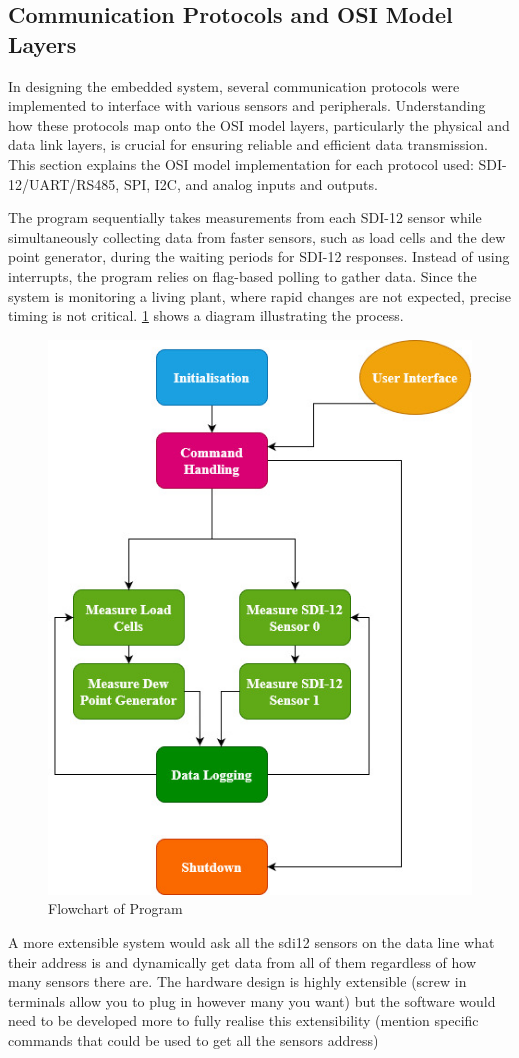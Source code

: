\subsection{Communication Protocols and OSI Model Layers}

In designing the embedded system, several communication protocols were implemented 
to interface with various sensors and peripherals. Understanding how these protocols 
map onto the OSI model layers, particularly the physical and data link layers, is 
crucial for ensuring reliable and efficient data transmission. This section explains 
the OSI model implementation for each protocol used: SDI-12/UART/RS485, SPI, I2C, 
and analog inputs and outputs.

The program sequentially takes measurements from each SDI-12 sensor while simultaneously 
collecting data from faster sensors, such as load cells and the dew point generator, during 
the waiting periods for SDI-12 responses. Instead of using interrupts, the program relies 
on flag-based polling to gather data. Since the system is monitoring a living plant, 
where rapid changes are not expected, precise timing is not critical. \cref{flowchart} shows  
a diagram illustrating the process.

\begin{figure}
    \includegraphics[width=0.4\linewidth]{figures/program_flowchart.jpg}
    \caption{Flowchart of Program}
    \label{flowchart}
\end{figure}


A more extensible system would ask all the sdi12 sensors on the data line what their address is 
and dynamically get data from all of them regardless of how many sensors there are. The hardware 
design is highly extensible (screw in terminals allow you to plug in however many you want) but 
the software would need to be developed more to fully realise this extensibility (mention specific 
commands that could be used to get all the sensors address)

